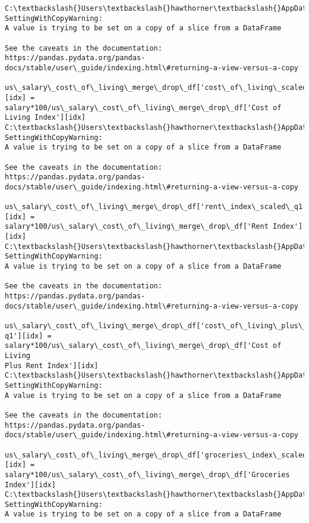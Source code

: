 \documentclass[11pt]{article}
\begin{document}
    \begin{Verbatim}[commandchars=\\\{\}]
C:\textbackslash{}Users\textbackslash{}hawthorner\textbackslash{}AppData\textbackslash{}Local\textbackslash{}Temp\textbackslash{}ipykernel\_22188\textbackslash{}94921046.py:21:
SettingWithCopyWarning:
A value is trying to be set on a copy of a slice from a DataFrame

See the caveats in the documentation: https://pandas.pydata.org/pandas-
docs/stable/user\_guide/indexing.html\#returning-a-view-versus-a-copy
  us\_salary\_cost\_of\_living\_merge\_drop\_df['cost\_of\_living\_scaled\_q1'][idx] =
salary*100/us\_salary\_cost\_of\_living\_merge\_drop\_df['Cost of Living Index'][idx]
C:\textbackslash{}Users\textbackslash{}hawthorner\textbackslash{}AppData\textbackslash{}Local\textbackslash{}Temp\textbackslash{}ipykernel\_22188\textbackslash{}94921046.py:22:
SettingWithCopyWarning:
A value is trying to be set on a copy of a slice from a DataFrame

See the caveats in the documentation: https://pandas.pydata.org/pandas-
docs/stable/user\_guide/indexing.html\#returning-a-view-versus-a-copy
  us\_salary\_cost\_of\_living\_merge\_drop\_df['rent\_index\_scaled\_q1'][idx] =
salary*100/us\_salary\_cost\_of\_living\_merge\_drop\_df['Rent Index'][idx]
C:\textbackslash{}Users\textbackslash{}hawthorner\textbackslash{}AppData\textbackslash{}Local\textbackslash{}Temp\textbackslash{}ipykernel\_22188\textbackslash{}94921046.py:23:
SettingWithCopyWarning:
A value is trying to be set on a copy of a slice from a DataFrame

See the caveats in the documentation: https://pandas.pydata.org/pandas-
docs/stable/user\_guide/indexing.html\#returning-a-view-versus-a-copy
  us\_salary\_cost\_of\_living\_merge\_drop\_df['cost\_of\_living\_plus\_rent\_index\_scaled\_
q1'][idx] = salary*100/us\_salary\_cost\_of\_living\_merge\_drop\_df['Cost of Living
Plus Rent Index'][idx]
C:\textbackslash{}Users\textbackslash{}hawthorner\textbackslash{}AppData\textbackslash{}Local\textbackslash{}Temp\textbackslash{}ipykernel\_22188\textbackslash{}94921046.py:24:
SettingWithCopyWarning:
A value is trying to be set on a copy of a slice from a DataFrame

See the caveats in the documentation: https://pandas.pydata.org/pandas-
docs/stable/user\_guide/indexing.html\#returning-a-view-versus-a-copy
  us\_salary\_cost\_of\_living\_merge\_drop\_df['groceries\_index\_scaled\_q1'][idx] =
salary*100/us\_salary\_cost\_of\_living\_merge\_drop\_df['Groceries Index'][idx]
C:\textbackslash{}Users\textbackslash{}hawthorner\textbackslash{}AppData\textbackslash{}Local\textbackslash{}Temp\textbackslash{}ipykernel\_22188\textbackslash{}94921046.py:25:
SettingWithCopyWarning:
A value is trying to be set on a copy of a slice from a DataFrame


\end{Verbatim}
\end{document}
